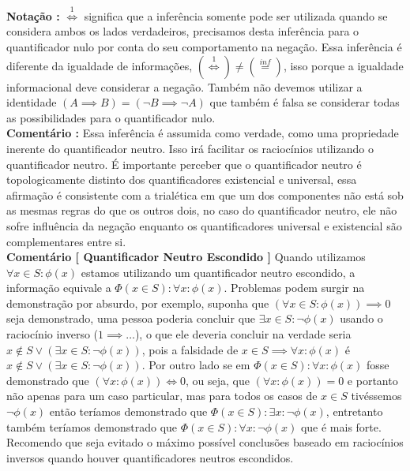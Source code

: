 \documentclass[10pt,a4paper]{report}
\begin{document}
\textbf{Notação :} $ \overset{1}{\iff} $ significa que a inferência somente pode ser utilizada quando se considera ambos os lados verdadeiros, precisamos desta inferência para o quantificador nulo por conta do seu comportamento na negação. Essa inferência é diferente da igualdade de informações, $ (\overset{1}{\iff} ) \ne (\overset{inf}{=}) $, isso porque a igualdade informacional deve considerar a negação. Também não devemos utilizar a identidade $(A \implies B) = (\neg B \implies \neg A)$ que também é falsa se considerar todas as possibilidades para o quantificador nulo.\\

\textbf{Comentário :} Essa inferência é assumida como verdade, como uma propriedade inerente do quantificador neutro. Isso irá facilitar os raciocínios utilizando o quantificador neutro. É importante perceber que o quantificador neutro é topologicamente distinto dos quantificadores existencial e universal, essa afirmação é consistente com a trialética em que um dos componentes não está sob as mesmas regras do que os outros dois, no caso do quantificador neutro, ele não sofre influência da negação enquanto os quantificadores universal e existencial são complementares entre si.\\

\textbf{Comentário [ Quantificador Neutro Escondido ]} Quando utilizamos $ \forall x \in S : \phi(x) $ estamos utilizando um quantificador neutro escondido, a informação equivale a $ \Phi( x \in S ) : \forall x : \phi(x) $. Problemas podem surgir na demonstração por absurdo, por exemplo, suponha que $ (\forall x \in S : \phi(x) ) \implies 0 $ seja demonstrado, uma pessoa poderia concluir que $ \exists x \in S : \neg \phi(x) $ usando o raciocínio inverso ($1 \implies \dots$), o que ele deveria concluir na verdade seria $ x \notin S \vee ( \exists x \in S : \neg \phi(x) ) $, pois a falsidade de  $ x \in S \implies \forall x : \phi(x) $ é $ x \notin S \vee ( \exists x \in S : \neg \phi(x) ) $. Por outro lado se em $ \Phi(x \in S) : \forall x : \phi(x) $ fosse demonstrado que $ ( \forall x : \phi(x) ) \iff 0 $, ou seja, que $ ( \forall x : \phi(x) ) = 0 $ e portanto não apenas para um caso particular, mas para todos os casos de $x \in S$ tivéssemos $\neg \phi(x)$ então teríamos demonstrado que $ \Phi(x \in S) : \exists x : \neg \phi(x) $, entretanto também teríamos demonstrado que $ \Phi(x \in S) : \forall x : \neg \phi(x) $ que é mais forte. Recomendo que seja evitado o máximo possível conclusões baseado em raciocínios inversos quando houver quantificadores neutros escondidos.
\end{document}
